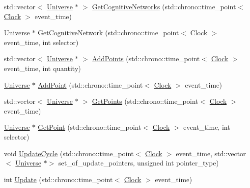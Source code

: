 \begin{DoxyCompactItemize}
\item 
std\+::vector$<$ \mbox{\hyperlink{classUniverse}{Universe}} $\ast$ $>$ \mbox{\hyperlink{classUniverse_a06968a24194280a43f077c5b77379ea8}{Get\+Cognitive\+Networks}} (std\+::chrono\+::time\+\_\+point$<$ \mbox{\hyperlink{universe_8h_a0ef8d951d1ca5ab3cfaf7ab4c7a6fd80}{Clock}} $>$ event\+\_\+time)
\item 
\mbox{\hyperlink{classUniverse}{Universe}} $\ast$ \mbox{\hyperlink{classUniverse_a1ea2b7e438bfdc7dd599aa59c310b126}{Get\+Cognitive\+Network}} (std\+::chrono\+::time\+\_\+point$<$ \mbox{\hyperlink{universe_8h_a0ef8d951d1ca5ab3cfaf7ab4c7a6fd80}{Clock}} $>$ event\+\_\+time, int selector)
\item 
std\+::vector$<$ \mbox{\hyperlink{classUniverse}{Universe}} $\ast$ $>$ \mbox{\hyperlink{classUniverse_aa48ced2078ba863723050d8283b3fa67}{Add\+Points}} (std\+::chrono\+::time\+\_\+point$<$ \mbox{\hyperlink{universe_8h_a0ef8d951d1ca5ab3cfaf7ab4c7a6fd80}{Clock}} $>$ event\+\_\+time, int quantity)
\item 
\mbox{\hyperlink{classUniverse}{Universe}} $\ast$ \mbox{\hyperlink{classUniverse_a8508b791c6997d8abcdcc037a6776734}{Add\+Point}} (std\+::chrono\+::time\+\_\+point$<$ \mbox{\hyperlink{universe_8h_a0ef8d951d1ca5ab3cfaf7ab4c7a6fd80}{Clock}} $>$ event\+\_\+time)
\item 
std\+::vector$<$ \mbox{\hyperlink{classUniverse}{Universe}} $\ast$ $>$ \mbox{\hyperlink{classUniverse_a765c6c658b7a465cd92418690db846ae}{Get\+Points}} (std\+::chrono\+::time\+\_\+point$<$ \mbox{\hyperlink{universe_8h_a0ef8d951d1ca5ab3cfaf7ab4c7a6fd80}{Clock}} $>$ event\+\_\+time)
\item 
\mbox{\hyperlink{classUniverse}{Universe}} $\ast$ \mbox{\hyperlink{classUniverse_a3774f14a13a55827a1a4eea0a404edcb}{Get\+Point}} (std\+::chrono\+::time\+\_\+point$<$ \mbox{\hyperlink{universe_8h_a0ef8d951d1ca5ab3cfaf7ab4c7a6fd80}{Clock}} $>$ event\+\_\+time, int selector)
\item 
void \mbox{\hyperlink{classUniverse_a0d79e614e1af951c06b78cb5768f9c8e}{Update\+Cycle}} (std\+::chrono\+::time\+\_\+point$<$ \mbox{\hyperlink{universe_8h_a0ef8d951d1ca5ab3cfaf7ab4c7a6fd80}{Clock}} $>$ event\+\_\+time, std\+::vector$<$ \mbox{\hyperlink{classUniverse}{Universe}} $\ast$$>$ set\+\_\+of\+\_\+update\+\_\+pointers, unsigned int pointer\+\_\+type)
\item 
int \mbox{\hyperlink{classUniverse_a64ee5a2c7e86c56fa426acb750438ce9}{Update}} (std\+::chrono\+::time\+\_\+point$<$ \mbox{\hyperlink{universe_8h_a0ef8d951d1ca5ab3cfaf7ab4c7a6fd80}{Clock}} $>$ event\+\_\+time)
$$
\end{DoxyCompactItemize}
